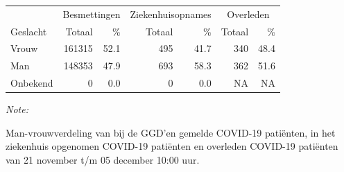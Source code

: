 \documentclass[
  english,
  man,floatsintext]{apa6}
\begin{document}
\newpage

\begin{table}
\centering\begingroup\fontsize{11}{13}\selectfont

\begin{threeparttable}
\begin{tabular}{lrrrrrr}
\toprule
\multicolumn{1}{c}{ } & \multicolumn{2}{c}{Besmettingen} & \multicolumn{2}{c}{Ziekenhuisopnames} & \multicolumn{2}{c}{Overleden} \\
\cmidrule(l{3pt}r{3pt}){2-3} \cmidrule(l{3pt}r{3pt}){4-5} \cmidrule(l{3pt}r{3pt}){6-7}
Geslacht & Totaal & \% & Totaal & \% & Totaal & \%\\
\midrule
Vrouw & 161315 & 52.1 & 495 & 41.7 & 340 & 48.4\\
Man & 148353 & 47.9 & 693 & 58.3 & 362 & 51.6\\
Onbekend & 0 & 0.0 & 0 & 0.0 & NA & NA\\
\bottomrule
\end{tabular}
\begin{tablenotes}
\item \textit{Note: } 
\item Man-vrouwverdeling van bij de GGD’en gemelde COVID-19 patiënten, in het ziekenhuis opgenomen COVID-19 patiënten en overleden COVID-19 patiënten van 21 november t/m 05 december 10:00 uur.
\end{tablenotes}
\end{threeparttable}
\endgroup{}
\end{table}
\newpage
\end{document}
